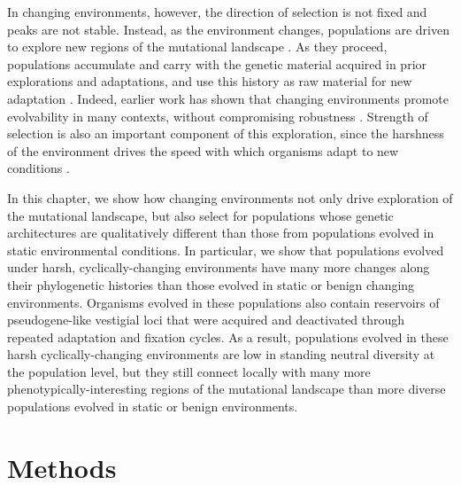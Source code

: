 \documentclass[PhD]{msu-thesis}
\begin{document}
In changing environments, however, the direction of selection is not fixed and peaks are not stable.  Instead, as the environment changes, populations are driven to explore new regions of the mutational landscape \cite{kashtan_varying_2007,connelly_negative_2015}. As they proceed, populations accumulate and carry with the genetic material acquired in prior explorations and adaptations, and use this history as raw material for new adaptation \cite{mcclintock_significance_1993}. Indeed, earlier work has shown that changing environments promote evolvability in many contexts, without compromising robustness \cite{crombach_evolution_2008,wilke_evolution_2001}. Strength of selection is also an important component of this exploration, since the harshness of the environment drives the speed with which organisms adapt to new conditions \cite{goddard_sex_2005}.

In this chapter, we show how changing environments not only drive exploration of the mutational landscape, but also select for populations whose genetic architectures are qualitatively different than those from populations evolved in static environmental conditions. In particular, we show that populations evolved under harsh, cyclically-changing environments have many more changes along their phylogenetic histories than those evolved in static or benign changing environments. Organisms evolved in these populations also contain reservoirs of pseudogene-like vestigial loci that were acquired and deactivated through repeated adaptation and fixation cycles. As a result, populations evolved in these harsh cyclically-changing environments are low in standing neutral diversity at the population level, but they still connect locally with many more phenotypically-interesting regions of the mutational landscape than more diverse populations evolved in static or benign environments.

\section{Methods}
\end{document}
